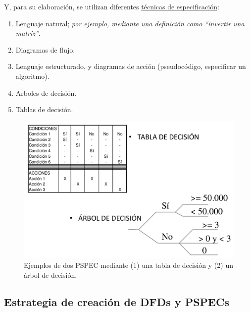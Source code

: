 Y, para su elaboración, se utilizan diferentes \uline{técnicas de especificación}:

\begin{enumerate}
    \item Lenguaje natural; \textit{por ejemplo, mediante una definición como ``invertir una matriz''}.
    \item Diagramas de flujo.
    \item Lenguaje estructurado, y diagramas de acción (pseudocódigo, especificar un algoritmo). 
    \item Arboles de decisión.
    \item Tablas de decisión.
\end{enumerate}

\begin{figure}[h!]
    \centering
    \includegraphics[width=0.6\linewidth]{Resources/Tema5/ejemplosPSPEC.png}
    \caption{Ejemplos de dos PSPEC mediante (1) una tabla de decisión y (2) un árbol de decisión.}
    \label{fig:ejemplosPSPEC}
\end{figure}

\subsection{Estrategia de creación de DFDs y PSPECs}

